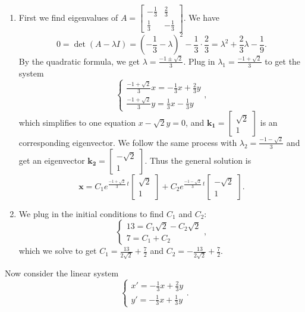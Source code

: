 \documentclass[12pt]{amsart}
\numberwithin{equation}{section}
\theoremstyle{plain} %
\theoremstyle{definition}
\theoremstyle{remark}
\begin{document}
\begin{framed}
\begin{enumerate}
\item First we find eigenvalues of $A= \begin{bmatrix} -\frac{1}{3} & \frac{2}{3} \\ \frac{1}{3}  & - \frac{1}{3}\end{bmatrix}$. We have \[ 0 = \det(A-\lambda I) = (-\frac{1}{3} - \lambda)^2 -\frac{1}{3} \cdot \frac{2}{3} = \lambda^2 + \frac{2}{3} \lambda - \frac{1}{9}.\]
By the quadratic formula, we get $\lambda = \frac{-1 \pm \sqrt{2}}{3}$.
Plug in $\lambda_1 = \frac{-1 + \sqrt{2}}{3}$ to get the system
\[ \begin{cases} \frac{-1 + \sqrt{2}}{3}x = -\frac{1}{3}x + \frac{2}{3}y \\ \frac{-1 + \sqrt{2}}{3}y = \frac{1}{3} x - \frac{1}{3} y\end{cases},\]
which simplifies to one equation $x - \sqrt{2} y = 0$, and $\mathbf{k_1} = \begin{bmatrix} \sqrt{2} \\ 1\end{bmatrix}$ is an corresponding eigenvector. We follow the same process with $\lambda_2 = \frac{-1 - \sqrt{2}}{3}$ and get an eigenvector $\mathbf{k_2} = \begin{bmatrix} -\sqrt{2} \\ 1\end{bmatrix}$. Thus the general solution is
\[ \mathbf{x} = C_1 e^{ \frac{-1 + \sqrt{2}}{3} \, t} \begin{bmatrix} \sqrt{2} \\ 1\end{bmatrix} + C_2 e^{ \frac{-1 - \sqrt{2}}{3} \, t} \begin{bmatrix} -\sqrt{2} \\ 1\end{bmatrix}.\]
\item  We plug in the initial conditions to find $C_1$ and $C_2$:
\[ \begin{cases} 13 = C_1 \sqrt{2} - C_2 \sqrt{2} \\ 7 = C_1 + C_2 \end{cases},\]
which we solve to get $C_1 = \frac{13}{2\sqrt{2}} + \frac{7}{2}$ and $C_2 = -\frac{13}{2\sqrt{2}} + \frac{7}{2}$.

\end{enumerate}
\end{framed}

Now consider the linear system
\[ \begin{cases} x' = -\frac{1}{3} x + \frac{2}{3} y \\ y' = -\frac{1}{3} x + \frac{1}{3} y\end{cases}.\]
\end{document}
